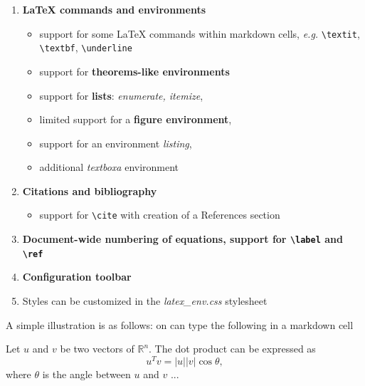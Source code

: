 \begin{enumerate}
\item \textbf{LaTeX commands and environments}

\begin{itemize}
\item support for some LaTeX commands within markdown cells, \emph{e.g.}
\texttt{\textbackslash{}textit}, \texttt{\textbackslash{}textbf},
\texttt{\textbackslash{}underline} \item support for
\textbf{theorems-like environments} \item support for \textbf{lists}:
\emph{enumerate, itemize},\\\item limited support for a \textbf{figure
environment}, \item support for an environment \emph{listing}, \item
additional \emph{textboxa} environment
\end{itemize}

\item \textbf{Citations and bibliography}

\begin{itemize}
\item support for \texttt{\textbackslash{}cite} with creation of a
References section
\end{itemize}

\item \textbf{Document-wide numbering of equations, support for
\texttt{\textbackslash{}label} and \texttt{\textbackslash{}ref}} \item
\textbf{Configuration toolbar} \item Styles can be customized in the
\emph{latex\_env.css} stylesheet
\end{enumerate}

A simple illustration is as follows: on can type the following in a
markdown cell

\begin{listing}
\begin{theorem} \label{theo:dotp}
Let $u$ and $v$ be two vectors of $\mathbb{R}^n$. The dot product can be expressed as
\begin{equation}
\label{eq:dotp}
u^Tv = |u||v| \cos \theta,
\end{equation}
where $\theta$ is the angle between $u$ and $v$ ...
\end{theorem}
\end{listing}

